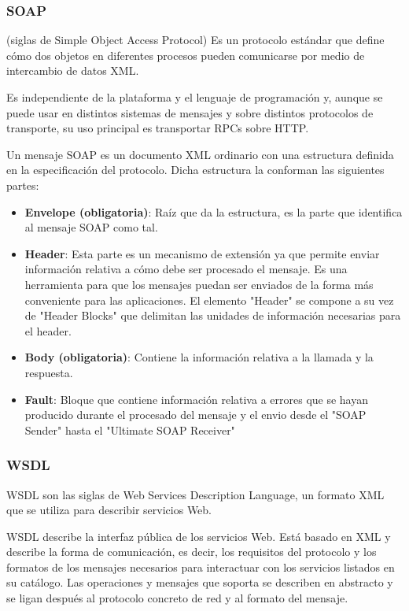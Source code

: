 \subsubsection{SOAP}
\begin{defn}[SOAP]
(siglas de Simple Object Access Protocol) Es un protocolo estándar que define cómo dos objetos en diferentes procesos pueden comunicarse por medio de intercambio de datos XML.

Es independiente de la plataforma y el lenguaje de programación y, aunque se puede usar en distintos sistemas de mensajes y sobre distintos protocolos de transporte, su uso principal es transportar RPCs sobre HTTP.
\end{defn}

Un mensaje SOAP es un documento XML ordinario con una estructura definida en la especificación del protocolo. Dicha estructura la conforman las siguientes partes:
\begin{itemize}
\item \textbf{Envelope (obligatoria)}: Raíz que da la estructura, es la parte que identifica al mensaje SOAP como tal.
\item \textbf{Header}: Esta parte es un mecanismo de extensión ya que permite enviar información relativa a cómo debe ser procesado el mensaje. Es una herramienta para que los mensajes puedan ser enviados de la forma más conveniente para las aplicaciones. El elemento "Header" se compone a su vez de "Header Blocks" que delimitan las unidades de información necesarias para el header.
\item \textbf{Body (obligatoria)}: Contiene la información relativa a la llamada y la respuesta.
\item \textbf{Fault}: Bloque que contiene información relativa a errores que se hayan producido durante el procesado del mensaje y el envio desde el "SOAP Sender" hasta el "Ultimate SOAP Receiver"
\end{itemize}

\subsubsection{WSDL}
\begin{defn}[WSDL]
WSDL son las siglas de Web Services Description Language, un formato XML que se utiliza para describir servicios Web.

WSDL describe la interfaz pública de los servicios Web. Está basado en XML y describe la forma de comunicación, es decir, los requisitos del protocolo y los formatos de los mensajes necesarios para interactuar con los servicios listados en su catálogo. Las operaciones y mensajes que soporta se describen en abstracto y se ligan después al protocolo concreto de red y al formato del mensaje.
\end{defn}

